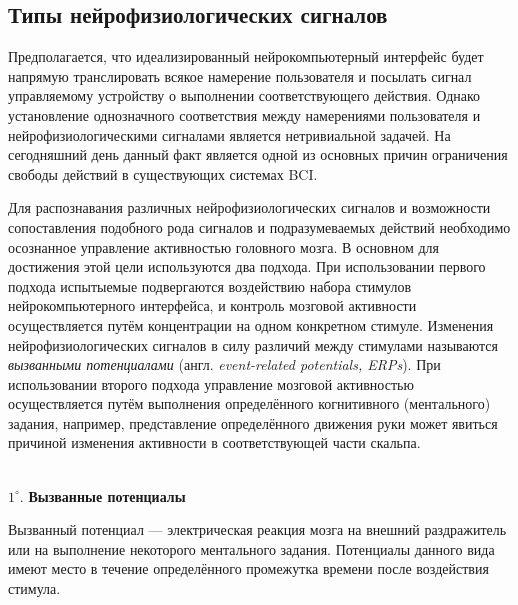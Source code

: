 \documentclass[12pt,fleqn]{article}
\begin{document}
	\subsection{Типы нейрофизиологических сигналов}
	\par Предполагается, что идеализированный нейрокомпьютерный интерфейс будет напрямую транслировать всякое намерение пользователя и посылать сигнал управляемому устройству о выполнении соответствующего действия. Однако установление однозначного соответствия между намерениями пользователя и нейрофизиологическими сигналами является нетривиальной задачей. На сегодняшний день данный факт является одной из основных причин ограничения свободы действий в существующих системах BCI.
	\par Для распознавания различных нейрофизиологических сигналов и возможности сопоставления подобного рода сигналов и подразумеваемых действий необходимо осознанное управление активностью головного мозга. В основном для достижения этой цели используются два подхода. При использовании первого подхода испытыемые подвергаются воздействию набора стимулов нейрокомпьютерного интерфейса, и контроль мозговой активности осуществляется путём концентрации на одном конкретном стимуле. Изменения нейрофизиологических сигналов в силу различий между стимулами называются {\it вызванными потенциалами} (англ. {\it event-related potentials, ERPs}). При использовании второго подхода управление мозговой активностью осуществляется путём выполнения определённого когнитивного (ментального) задания, например, представление определённого движения руки может явиться причиной изменения активности в соответствующей части скальпа.\\ \\
	\par $1^{\circ}.$ {\bf Вызванные потенциалы}
	\par Вызванный потенциал — электрическая реакция мозга на внешний раздражитель или на выполнение некоторого ментального задания. Потенциалы данного вида имеют место в течение определённого промежутка времени после воздействия стимула.
\end{document}
